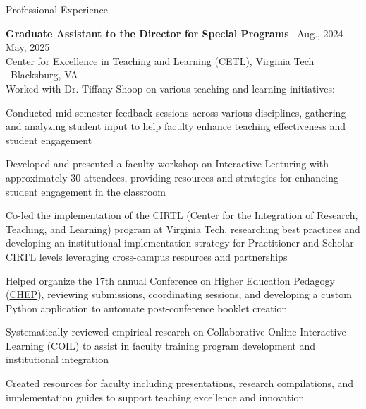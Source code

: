 \documentclass{resume}
\begin{document}
\begin{rSection}{Professional Experience}

{\bf Graduate Assistant to the Director for Special Programs} \hfill {\ Aug., 2024 - May, 2025 }\\ 
{\href{https://teaching.vt.edu/}{Center for Excellence in Teaching and Learning (CETL)}, Virginia Tech} \hfill {\ {Blacksburg, VA}}\\
Worked with Dr. Tiffany Shoop on various teaching and learning initiatives:
\begin{cvitems}
    \item Conducted mid-semester feedback sessions across various disciplines, gathering and analyzing student input to help faculty enhance teaching effectiveness and student engagement
    \item Developed and presented a faculty workshop on Interactive Lecturing with approximately 30 attendees, providing resources and strategies for enhancing student engagement in the classroom
    \item Co-led the implementation of the \href{https://cirtl.vt.edu/}{CIRTL} (Center for the Integration of Research, Teaching, and Learning) program at Virginia Tech, researching best practices and developing an institutional implementation strategy for Practitioner and Scholar CIRTL levels leveraging cross-campus resources and partnerships
    \item Helped organize the 17th annual Conference on Higher Education Pedagogy (\href{https://chep.teaching.vt.edu/}{CHEP}), reviewing submissions, coordinating sessions, and developing a custom Python application to automate post-conference booklet creation
    \item Systematically reviewed empirical research on Collaborative Online Interactive Learning (COIL) to assist in faculty training program development and institutional integration
    \item Created resources for faculty including presentations, research compilations, and implementation guides to support teaching excellence and innovation
\end{cvitems}



\end{rSection}
\end{document}
